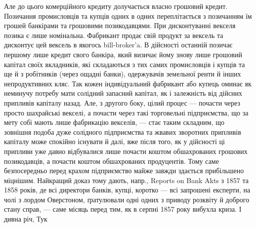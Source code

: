Але до цього комерційного кредиту долучається власно грошовий кредит. Позичання
промисловців та купців одних в одних переплітається з позичанням їм
грошей банкірами та грошовими позикодавцями. При дисконтуванні векселя позика
є лише номінальна. Фабрикант продає свій продукт за вексель та дисконтує
цей вексель в якогось bill-broker’a. В дійсності останній позичає першому
лише кредит свого банкіра, який визичає йому знову лише грошовий капітал
своїх вкладників, які складаються з тих самих промисловців і купців та ще й
з робітників (через ощадні банки), одержувачів земельної ренти й інших непродуктивних
кляс. Так кожен індивідуальний фабрикант або купець оминає як
неминучу потребу мати солідний запасний капітал, як і залежність від дійсних
припливів капіталу назад. Але, з другого боку, цілий процес — почасти через просто
шахрайські векселі, а почасти через такі торговельні підприємства, що за мету
собі мають лише фабрикацію векселів, — стає таким складним, що зовнішня подоба
дуже солідного підприємства та жвавих зворотних припливів капіталу може
спокійно існувати й далі, вже після того, як у дійсності ці припливи уже давно
відбувалися лише почасти коштом обшахрованих грошових позикодавців, а почасти
коштом обшахрованих продуцентів. Тому саме безпосередньо перед крахом
підприємство майже завжди здається прибільшено міцнішим. Найкращий
доказ тому дають, напр., Reports on Bank Akts з 1857 та 1858 років, де всі
директори банків, купці, коротко — всі запрошені експерти, на чолі з лордом
Оверстоном, ґратулювали одні одних з приводу розквіту й доброго стану справ, —
саме місяць перед тим, як в серпні 1857 року вибухла криза. І дивна річ, Тук
\parbreak{}  %
